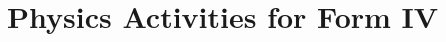 \documentclass[10pt,a4paper,twoside]{report}
\begin{document}
%
%
%
%
%
%
%


\chapter{Physics Activities for Form IV}
%
%
%
%

%
%
%
%
\end{document}
